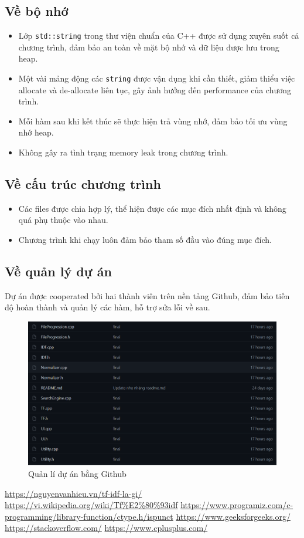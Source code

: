 \documentclass[12pt,a4paper]{article}
\begin{document}
\subsection{Về bộ nhớ}
\begin{itemize}
\item Lớp \lstinline{std::string} trong thư viện chuẩn của C++ được sử dụng xuyên suốt cả chương trình, đảm bảo an toàn về mặt bộ nhớ và dữ liệu được lưu trong heap.
\item Một vài mảng động các \lstinline{string} được vận dụng khi cần thiết, giảm thiểu việc allocate và de-allocate liên tục, gây ảnh hưởng đến performance của chương trình.
\item Mỗi hàm sau khi kết thúc sẽ thực hiện trả vùng nhớ, đảm bảo tối ưu vùng nhớ heap.
\item Không gây ra tình trạng memory leak trong chương trình.
\end{itemize}
\subsection{Về cấu trúc chương trình}
\begin{itemize}
\item Các files được chia hợp lý, thể hiện được các mục đích nhất định và không quá phụ thuộc vào nhau.
\item Chương trình khi chạy luôn đảm bảo tham số đầu vào đúng mục đích.
\end{itemize}
\subsection{Về quản lý dự án}
Dự án được cooperated bởi hai thành viên trên nền tảng Github, đảm bảo tiến độ hoàn thành và quản lý các hàm, hỗ trợ sửa lỗi về sau.
\begin{figure}[H]
\begin{center}
\includegraphics[scale=0.4]{Fig32}
\end{center}
\caption{Quản lí dự án bằng Github}
\label{Fig32}
\end{figure}
\newpage
\begin{thebibliography}{99}
 \url{https://nguyenvanhieu.vn/tf-idf-la-gi/}
 \url{https://vi.wikipedia.org/wiki/Tf%E2%80%93idf}
 \url{https://www.programiz.com/c-programming/library-function/ctype.h/ispunct}
 \url{https://www.geeksforgeeks.org/}
 \url{https://stackoverflow.com/}
 \url{https://www.cplusplus.com/}
\end{thebibliography}
\end{document}
